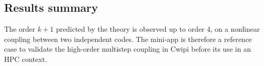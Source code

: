 

\subsection{Results summary}

The order $k+1$ predicted by the theory is observed up to order 4, on a
nonlinear coupling between two independent codes. The mini-app is therefore a
reference case to validate the high-order multistep coupling in Cwipi before
its use in an HPC context.
